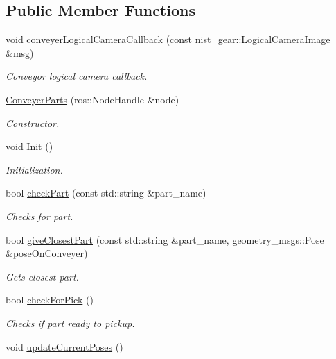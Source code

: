 \subsection*{Public Member Functions}
\begin{DoxyCompactItemize}
\item 
void \hyperlink{classConveyerParts_a4e63b43cf4de0e31ed58a89b1fc2654c}{conveyer\+Logical\+Camera\+Callback} (const nist\+\_\+gear\+::\+Logical\+Camera\+Image \&msg)
\begin{DoxyCompactList}\small\item\em Conveyor logical camera callback. \end{DoxyCompactList}\item 
\hyperlink{classConveyerParts_a0b511cdd3b2d0c0587901b1443f43d49}{Conveyer\+Parts} (ros\+::\+Node\+Handle \&node)
\begin{DoxyCompactList}\small\item\em Constructor. \end{DoxyCompactList}\item 
void \hyperlink{classConveyerParts_ab701aac222b631fdf7a1d2a3465eaa67}{Init} ()
\begin{DoxyCompactList}\small\item\em Initialization. \end{DoxyCompactList}\item 
bool \hyperlink{classConveyerParts_aaa9a8364efc6d4247d8d5585b6b21859}{check\+Part} (const std\+::string \&part\+\_\+name)
\begin{DoxyCompactList}\small\item\em Checks for part. \end{DoxyCompactList}\item 
bool \hyperlink{classConveyerParts_a57188292039617070e9042ad3133a5f8}{give\+Closest\+Part} (const std\+::string \&part\+\_\+name, geometry\+\_\+msgs\+::\+Pose \&pose\+On\+Conveyer)
\begin{DoxyCompactList}\small\item\em Gets closest part. \end{DoxyCompactList}\item 
bool \hyperlink{classConveyerParts_a8a536ff479f28fcb38cf454a41f8387e}{check\+For\+Pick} ()
\begin{DoxyCompactList}\small\item\em Checks if part ready to pickup. \end{DoxyCompactList}\item 
void \hyperlink{classConveyerParts_a46d0279dd64806ce55fad19c84447faa}{update\+Current\+Poses} ()

\end{DoxyCompactItemize}
